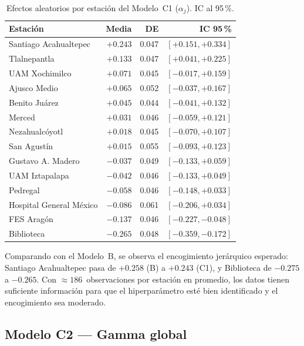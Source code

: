 \documentclass[12pt]{article}
\begin{document}
\begin{table}[H]
\centering
\caption{Efectos aleatorios por estaci\'on del Modelo~C1 ($\alpha_j$).
         IC al 95\,\%.}
\label{tab:alphaj_C1}
\small
\begin{tabular}{>{\raggedright\arraybackslash}p{5.5cm}rrr}
\toprule
Estaci\'on & Media & DE & IC 95\,\% \\
\midrule
Santiago Acahualtepec   & $+0.243$ & 0.047 & $[+0.151,+0.334]$ \\
Tlalnepantla            & $+0.133$ & 0.047 & $[+0.041,+0.225]$ \\
UAM Xochimilco          & $+0.071$ & 0.045 & $[-0.017,+0.159]$ \\
Ajusco Medio            & $+0.065$ & 0.052 & $[-0.037,+0.167]$ \\
Benito Ju\'arez         & $+0.045$ & 0.044 & $[-0.041,+0.132]$ \\
Merced                  & $+0.031$ & 0.046 & $[-0.059,+0.121]$ \\
Nezahualc\'oyotl        & $+0.018$ & 0.045 & $[-0.070,+0.107]$ \\
San Agust\'in           & $+0.015$ & 0.055 & $[-0.093,+0.123]$ \\
Gustavo A. Madero       & $-0.037$ & 0.049 & $[-0.133,+0.059]$ \\
UAM Iztapalapa          & $-0.042$ & 0.046 & $[-0.133,+0.049]$ \\
Pedregal                & $-0.058$ & 0.046 & $[-0.148,+0.033]$ \\
Hospital General M\'exico& $-0.086$ & 0.061 & $[-0.206,+0.034]$ \\
FES Arag\'on            & $-0.137$ & 0.046 & $[-0.227,-0.048]$ \\
Biblioteca              & $-0.265$ & 0.048 & $[-0.359,-0.172]$ \\
\bottomrule
\end{tabular}
\normalsize
\end{table}

Comparando con el Modelo~B, se observa el encogimiento jer\'arquico
esperado: Santiago Acahualtepec pasa de $+0.258$ (B) a $+0.243$ (C1),
y Biblioteca de $-0.275$ a $-0.265$.
Con $\approx 186$~observaciones por estaci\'on en promedio, los datos
tienen suficiente informaci\'on para que el hiperpar\'ametro est\'e bien
identificado y el encogimiento sea moderado.


\subsection{Modelo C2 --- Gamma global}
\end{document}
